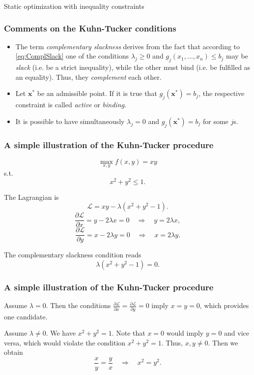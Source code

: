 \documentclass[10pt]{beamer}
\theoremstyle{definition}
\begin{document}
\begin{section}{Static optimization with inequality constraints}
\begin{frame}[fragile]
\frametitle{Comments on the Kuhn-Tucker conditions}
\begin{itemize}
\item The term \emph{complementary slackness} derives from the fact that according to \eqref{eq:ComplSlack} one of the conditions $ \lambda_j \geq 0 $ and $ g_j(x_1,\ldots,x_n) \leq b_j $ may be \emph{slack} (i.e. be a strict inequality), while the other must bind (i.e. be fulfilled as an equality). Thus, they \emph{complement} each other. \bigskip
\item Let $ \mathbf{x^*} $ be an admissible point. If it is true that $ g_j(\mathbf{x^*})=b_j $, the respective constraint is called \emph{active} or \emph{binding}. \bigskip
\item It is possible to have simultaneously $ \lambda_j = 0 $ and $ g_j(\mathbf{x^*})=b_j $ for some $ j $s. 
\end{itemize}
\end{frame}

\begin{frame}[fragile]
\frametitle{A simple illustration of the Kuhn-Tucker procedure}
\begin{example}
\[ \max_{x,y} f(x,y) = xy \]
s.t. \[ x^2+y^2 \leq 1. \]

The Lagrangian is
\[ \mathcal{L} = xy - \lambda (x^2+y^2-1). \]
\[ \dfrac{\partial \mathcal{L}}{\partial x} = y-2\lambda x=0 \quad \Rightarrow \quad y = 2\lambda x, \]
\[ \dfrac{\partial \mathcal{L}}{\partial y} = x-2\lambda y=0 \quad \Rightarrow \quad x = 2\lambda y. \]

The complementary slackness condition reads \[ \lambda (x^2+y^2-1)=0. \]
\label{ex:KTillustrated}
\end{example}
\end{frame}

\begin{frame}[fragile]
\frametitle{A simple illustration of the Kuhn-Tucker procedure}\addtocounter{theorem}{-1}
\begin{example}[cont.]
Assume $ \lambda = 0 $. Then the conditions $ \frac{\partial \mathcal{L}}{\partial x}=\frac{\partial \mathcal{L}}{\partial y}=0 $ imply $ x=y=0$, which provides one candidate.\bigskip

Assume $ \lambda \neq 0 $. We have $ x^2+y^2 = 1 $. Note that $ x=0 $ would imply $ y=0 $ and vice versa, which would violate the condition $ x^2+y^2 = 1 $. Thus, $ x,y \neq 0 $. Then we obtain \[ \dfrac{x}{y}=\dfrac{y}{x} \quad \Rightarrow \quad x^2 = y^2. \]\bigskip
\end{example}
\end{frame}


\end{section}
\end{document}
